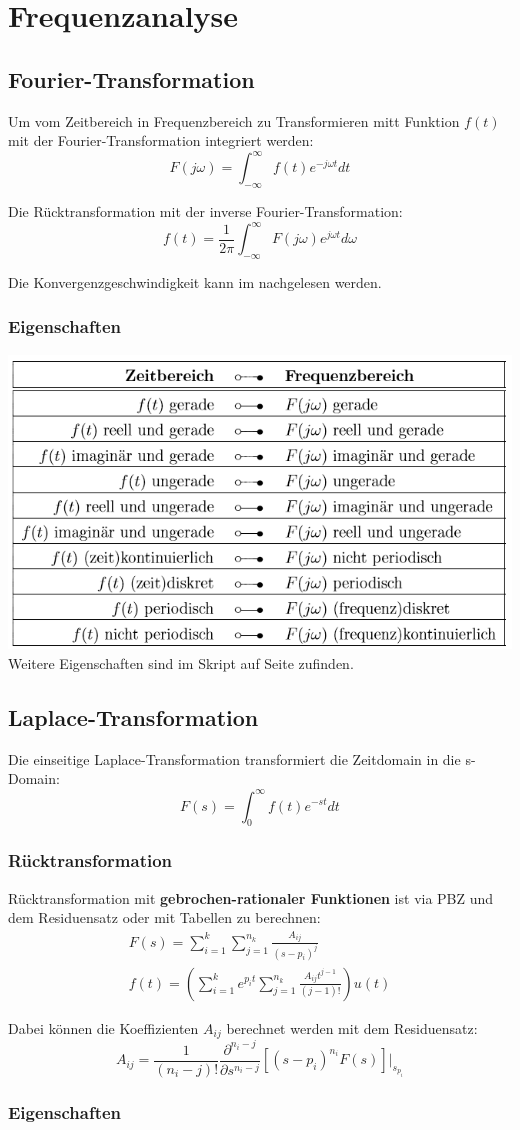 \section{Frequenzanalyse}
\subsection{Fourier-Transformation}
 Um vom Zeitbereich in Frequenzbereich zu Transformieren mitt Funktion $f(t)$ mit der Fourier-Transformation integriert werden:
\[
	F(j\omega) = \int_{-\infty}^{\infty}f(t)e^{-j\omega t}dt
\]

Die Rücktransformation mit der inverse Fourier-Transformation:
\[
f(t) = \frac{1}{2\pi}\int_{-\infty}^{\infty}F(j\omega)e^{j\omega t}d\omega
\]

Die Konvergenzgeschwindigkeit kann im  nachgelesen werden.

\subsubsection{Eigenschaften}
\includegraphics[width=\columnwidth]{Images/fourier_eigenschaten}
Weitere Eigenschaften sind im Skript auf Seite  zufinden.

\subsection{Laplace-Transformation}
 Die einseitige Laplace-Transformation transformiert die Zeitdomain in die s-Domain:
\[
F(s) = \int_{0}^{\infty}f(t)e^{-st}dt
\]

\subsubsection{Rücktransformation}
 Rücktransformation mit \textbf{gebrochen-rationaler Funktionen} ist via PBZ und dem Residuensatz oder mit Tabellen  zu berechnen:
\begin{align*}
	F(s) = \sum_{i=1}^{k}\sum_{j=1}^{n_k}\frac{A_{ij}}{(s-p_i)^j} \\
	f(t) = \left(\sum_{i=1}^{k}e^{p_it}\sum_{j=1}^{n_k}\frac{A_{ij}t^{j-1}}{(j-1)!}\right)u(t)
\end{align*}

Dabei können die Koeffizienten $A_{ij}$ berechnet werden mit dem Residuensatz:
\[
A_{ij} = \frac{1}{(n_i - j)!}\frac{\partial^{n_i-j}}{\partial s^{n_i -j}}[(s-{p_i})^{n_i}F(s)]|_{s_{p_i}}
\]

\subsubsection{Eigenschaften}
